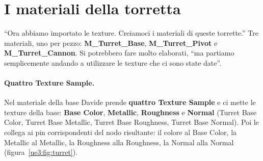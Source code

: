 \section{I materiali della torretta}
\label{ue3:sec:matturret}

``Ora abbiamo importato le texture. Creiamoci i materiali di queste torrette.'' Tre
materiali, uno per pezzo: \textbf{M\_Turret\_Base}, \textbf{M\_Turret\_Pivot} e
\textbf{M\_Turret\_Cannon}. Si potrebbero fare molto elaborati, ``ma partiamo
semplicemente andando a utilizzare le texture che ci sono state date''.

\paragraph{Quattro Texture Sample.} Nel materiale della base Davide prende \textbf{quattro
Texture Sample} e ci mette le texture della base: \textbf{Base Color},
\textbf{Metallic}, \textbf{Roughness} e \textbf{Normal} (Turret Base Color, Turret Base
Metallic, Turret Base Roughness, Turret Base Normal). Poi le collega ai pin
corrispondenti del nodo risultante: il colore al Base Color, la Metallic al Metallic, la
Roughness alla Roughness, la Normal alla Normal (figura~\ref{ue3:fig:turret}).

